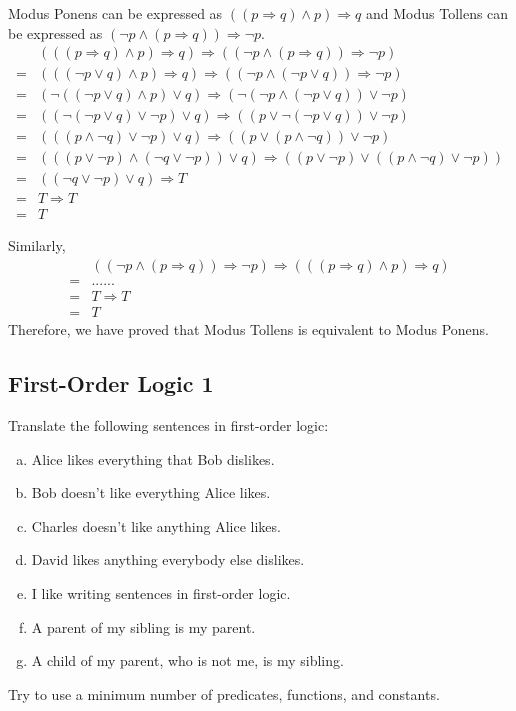 \documentclass[11pt, answers]{exam}
\begin{document}
\begin{solution}
Modus Ponens can be expressed as $((p \Rightarrow q) \wedge p)\Rightarrow q$ and Modus Tollens can be expressed as $(\neg p \wedge (p\Rightarrow q))\Rightarrow \neg p$.
\begin{align*}
&(((p \Rightarrow q) \wedge p)\Rightarrow q ) \Rightarrow ((\neg p \wedge (p\Rightarrow q))\Rightarrow \neg p)\\
=&(((\neg p \vee q) \wedge p)\Rightarrow q ) \Rightarrow ((\neg p \wedge (\neg p \vee q))\Rightarrow \neg p)\\
=&(\neg((\neg p \vee q) \wedge p)\vee q ) \Rightarrow (\neg(\neg p \wedge (\neg p \vee q))\vee \neg p)\\
=&((\neg(\neg p \vee q) \vee \neg p)\vee q ) \Rightarrow ((p \vee \neg (\neg p \vee q))\vee \neg p)\\
=&(((p \wedge \neg q) \vee \neg p)\vee q ) \Rightarrow ((p \vee (p \wedge \neg q))\vee \neg p)\\
=&(((p \vee \neg p) \wedge (\neg q \vee \neg p))\vee q ) \Rightarrow ((p \vee \neg p) \vee ((p \wedge \neg q)\vee \neg p))\\
=&((\neg q \vee \neg p)\vee q ) \Rightarrow T\\
=&T\Rightarrow T\\
=&T
\end{align*}

Similarly,
\begin{align*}
&((\neg p \wedge (p\Rightarrow q))\Rightarrow \neg p)\Rightarrow (((p \Rightarrow q) \wedge p)\Rightarrow q )\\
=&......\\
=&T\Rightarrow T\\
=&T
\end{align*}
Therefore, we have proved that Modus Tollens is equivalent to Modus Ponens.
\end{solution}

%
%
\begin{questions}
\section{First-Order Logic 1}
\question

Translate the following sentences in first-order logic:

\begin{enumerate}[a.]
\item Alice likes everything that Bob dislikes.
\item Bob doesn't like everything Alice likes.
\item Charles doesn't like anything Alice likes.
\item David likes anything everybody else dislikes.
\item I like writing sentences in first-order logic.
\item A parent of my sibling is my parent.
\item A child of my parent, who is not me, is my sibling.
\end{enumerate}

Try to use a minimum number of predicates, functions, and constants.

\end{questions}
\end{document}

